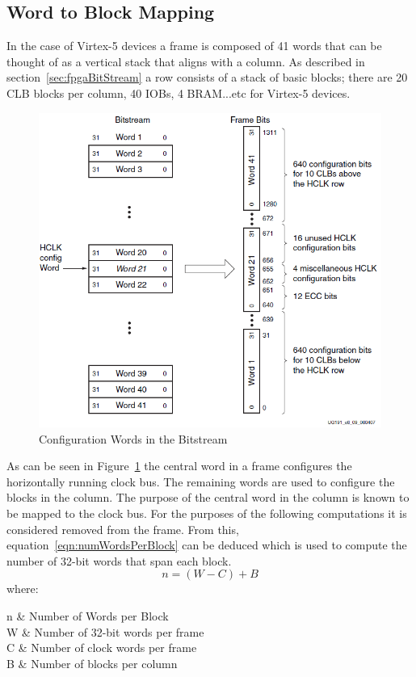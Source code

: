 \subsection{Word to Block Mapping}
In the case of Virtex-5 devices a frame is composed of 41 words that can be thought of as a vertical stack that aligns with a column.
As described in section~\ref{sec:fpgaBitStream} a row consists of a stack of basic blocks; there are 20 \acrshort{CLB} blocks per column, 40 \acrshort{IOB}s, 4 \acrshort{BRAM}...etc for Virtex-5 devices.
\begin{figure}[h]
	\centering
	\includegraphics[width=0.9\linewidth]{Figures/frameTileMap}
	\caption[Configuration Words in the Bitstream~\cite{virtex5ConfigGuide}]{Configuration Words in the Bitstream~\cite{virtex5ConfigGuide}}
	\label{fig:frameTileMap}
\end{figure}
As can be seen in Figure~\ref{fig:frameTileMap} the central word in a frame configures the horizontally running clock bus.
The remaining words are used to configure the blocks in the column.
The purpose of the central word in the column is known to be mapped to the clock bus.
For the purposes of the following computations it is considered removed from the frame.
From this, equation~\ref{eqn:numWordsPerBlock} can be deduced which is used to compute the number of 32-bit words that span each block.
\begin{equation} \label{eqn:numWordsPerBlock}
n = (W - C) + B
\end{equation}
\ConditionSize
where:
\begin{conditions}
	n     &  Number of Words per Block \\
	W     &  Number of 32-bit words per frame \\   
	C     &  Number of clock words per frame \\
	B     &  Number of blocks per column
\end{conditions}
